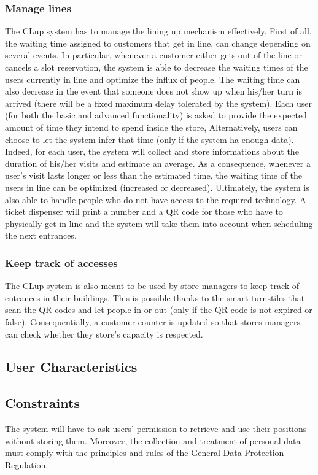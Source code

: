 \documentclass{article}
\begin{document}
\subsubsection{Manage lines} 
The CLup system has to manage the lining up mechanism effectively. First of all, the waiting time assigned to customers that get in line, can change depending on several events. In particular, whenever a customer either gets out of the line or cancels a slot reservation, the system is able to decrease the waiting times of the users currently in line and optimize the influx of people. The waiting time can also decrease in the event that someone does not show up when his/her turn is arrived (there will be a fixed maximum delay tolerated by the system). Each user (for both the basic and advanced functionality) is asked to provide the expected amount of time they intend to spend inside the store, Alternatively, users can choose to let the system infer that time (only if the system ha enough data). Indeed, for each user, the system will collect and store informations about the duration of his/her visits and estimate an average. As a consequence, whenever a user’s visit lasts longer or less than the estimated time, the waiting time of the users in line can be optimized (increased or decreased). Ultimately, the system is also able to handle people who do not have access to the required technology. A ticket dispenser will print a number and a QR code for those who have to physically get in line and the system will take them into account when scheduling the next entrances.
\subsubsection{Keep track of accesses} 
The CLup system is also meant to be used by store managers to keep track of entrances in their buildings. This is possible thanks to the smart turnstiles that scan the QR codes and let people in or out (only if the QR code is not expired or false). Consequentially, a customer counter is updated  so that stores managers can check whether they store’s capacity is respected.
\subsection{User Characteristics}
\subsection{Constraints}
The system will have to ask users' permission to retrieve and use their positions without storing them. Moreover, the collection and treatment of personal data must comply with the principles and rules of the General Data Protection Regulation.
\end{document}
